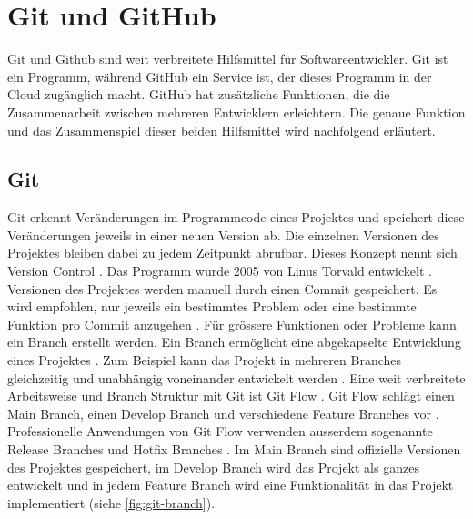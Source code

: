 \section{Git und GitHub}\label{chap:t_git} Git und Github sind weit verbreitete
Hilfsmittel für Softwareentwickler. Git ist ein Programm, während GitHub ein
Service ist, der dieses Programm in der Cloud zugänglich macht. GitHub hat
zusätzliche Funktionen, die die Zusammenarbeit zwischen mehreren Entwicklern
erleichtern. Die genaue Funktion und das Zusammenspiel dieser beiden Hilfsmittel
wird nachfolgend erläutert.
 
\subsection{Git}\label{sub:t_git_git} Git erkennt Veränderungen im Programmcode eines
Projektes und speichert diese Veränderungen jeweils in einer neuen Version ab. Die
einzelnen Versionen des Projektes bleiben dabei zu jedem Zeitpunkt abrufbar.
Dieses Konzept nennt sich Version Control
\cite{atlassian_what_nodate}. Das Programm wurde 2005 von Linus
Torvald entwickelt \cite{noauthor_git_2021}. Versionen des Projektes werden
manuell durch einen Commit gespeichert. Es wird empfohlen, nur jeweils ein
bestimmtes Problem oder eine bestimmte Funktion pro Commit anzugehen
\cite{noauthor_5_2019}. Für grössere Funktionen oder Probleme kann ein Branch
erstellt werden. Ein Branch ermöglicht eine abgekapselte Entwicklung eines
Projektes \cite{guillermo_brachetta_what_2022}. Zum Beispiel kann das Projekt in
mehreren Branches gleichzeitig und unabhängig voneinander entwickelt werden
\cite{guillermo_brachetta_what_2022}. Eine weit verbreitete Arbeitsweise und
Branch Struktur mit Git ist Git Flow
\cite{noauthor_what_2022}\cite{atlassian_git-flow-workflow_nodate}. Git Flow
schlägt einen Main Branch, einen Develop Branch und verschiedene
Feature Branches vor \cite{atlassian_git-flow-workflow_nodate}. Professionelle
Anwendungen von Git Flow verwenden ausserdem sogenannte Release Branches und
Hotfix Branches \cite{cameron_mckenzie_gitflow_2021}. Im Main Branch sind
offizielle Versionen des Projektes gespeichert, im Develop Branch wird das
Projekt als ganzes entwickelt und in jedem Feature Branch wird eine
Funktionalität in das Projekt implementiert (siehe \autoref{fig:git-branch}).

